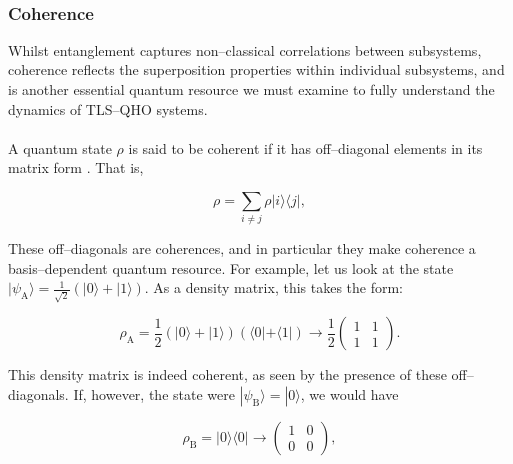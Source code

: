 \documentclass[12pt]{article}
\begin{document}
\\
\subsubsection{Coherence} \label{sec:theory_sub_coh}

Whilst entanglement captures non--classical correlations between subsystems, coherence reflects the superposition properties within individual subsystems, and is another essential quantum resource we must examine to fully understand the dynamics of TLS--QHO systems.\\
\\
A quantum state $\rho$ is said to be coherent if it has off--diagonal elements in its matrix form \cite{Coherence2017-Colloquium}. That is,

\begin{equation}
    \rho = \sum_{i\neq j}\rho|i\rangle\langle j|,
\end{equation}

These off--diagonals are coherences, and in particular they make coherence a basis--dependent quantum resource. For example, let us look at the state $|\psi_{\scriptscriptstyle \text{A}}\rangle = \frac{1}{\sqrt{2}}(|0\rangle + |1\rangle)$. As a density matrix, this takes the form:

\begin{equation*}
    \rho_{\scriptscriptstyle \text{A}} = \frac{1}{2}(|0\rangle + |1\rangle)(\langle0| +\langle1|) \rightarrow \frac{1}{2}
    \begin{pmatrix}
        1 & 1 \\
        1 & 1
    \end{pmatrix}.
\end{equation*}

This density matrix is indeed coherent, as seen by the presence of these off--diagonals. If, however, the state were $|\psi_{\scriptscriptstyle \text{B}}\rangle = |0\rangle$, we would have

\begin{equation*}
    \rho_{\scriptscriptstyle \text{B}} = |0\rangle\langle0| \rightarrow 
    \begin{pmatrix}
        1 & 0 \\
        0 & 0
    \end{pmatrix},
\end{equation*}
\end{document}
